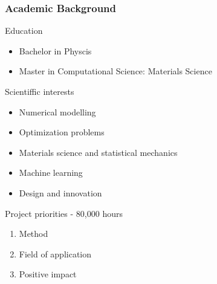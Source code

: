 \documentclass[
	10pt, %
]{beamer}
\begin{document}
\begin{frame}
	\frametitle{Academic Background}

	{\large Education}
	\begin{itemize}
		\item Bachelor in Physcis
		\item Master in Computational Science: Materials Science 
	\end{itemize}
	\vspace{0.3cm}
	
	{\large Scientiffic interests}
	\begin{itemize}
		\item Numerical modelling
		\item Optimization problems
		\item Materials science and statistical mechanics
		\item Machine learning
		\item Design and innovation
	\end{itemize}
	\vspace{0.3cm}

	{\large Project priorities - 80,000 hours}
	\begin{enumerate}
		\item Method
		\item Field of application 
		\item Positive impact 
	\end{enumerate}
\end{frame}
\end{document}
